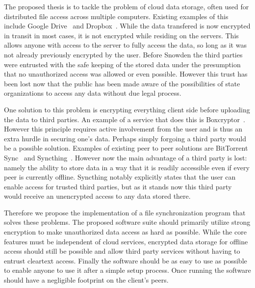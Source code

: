 \documentclass[a4paper,10pt,twoside]{article}
\begin{document}
The proposed thesis is to tackle the problem of cloud data storage, often used for distributed file access across multiple computers.
Existing examples of this include Google Drive~\cite{web:site:gdrive} and Dropbox~\cite{web:site:dropbox}.
While the data transfered is now encrypted in transit in most cases, it is not encrypted while residing on the servers.
This allows anyone with access to the server to fully access the data, so long as it was not already previously encrypted by the user.
Before Snowden the third parties were entrusted with the safe keeping of the stored data under the presumption that no unauthorized access was allowed or even possible.
However this trust has been lost now that the public has been made aware of the possibilities of state organizations to access any data without due legal process.

One solution to this problem is encrypting everything client side before uploading the data to third parties.
An example of a service that does this is Boxcryptor~\cite{web:site:boxcryptor}.
However this principle requires active involvement from the user and is thus an extra hurdle in securing one's data.
Perhaps simply forgoing a third party would be a possible solution.
Examples of existing peer to peer solutions are BitTorrent Sync~\cite{web:site:bittorrent_sync} and Syncthing~\cite{web:site:synthing}.
However now the main advantage of a third party is lost: namely the ability to store data in a way that it is readily accessible even if every peer is currently offline.
Syncthing notably explicitly states that the user can enable access for trusted third parties, but as it stands now this third party would receive an unencrypted access to any data stored there.

Therefore we propose the implementation of a file synchronization program that solves these problems.
The proposed software suite should primarily utilize strong encryption to make unauthorized data access as hard as possible.
While the core features must be independent of cloud services, encrypted data storage for offline access should still be possible and allow third party services without having to entrust cleartext access.
Finally the software should be as easy to use as possible to enable anyone to use it after a simple setup process.
Once running the software should have a negligible footprint on the client's peers.
\end{document}
